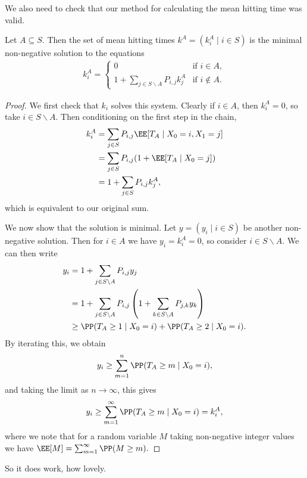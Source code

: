 We also need to check that our method for calculating the mean hitting time was valid.

\begin{theorem}
	Let $A \subseteq S$. Then the set of mean hitting times $k^A = (k_i^A \mid i \in S)$ is the minimal non-negative solution to the equations
	\begin{align*}
		k_i^A = \begin{cases}
			0 &\mbox{if } i  \in A, \\
			1 + \sum_{j \in S\backslash A} P_{i, j} k_j^A &\mbox{if } i \not \in A.
		   \end{cases}
	\end{align*}
\end{theorem}
\begin{proof}
	We first check that $k_i$ solves this system. Clearly if $i \in A$, then $k_i^A = 0$, so take $i \in S \backslash A$. Then conditioning on the first step in the chain,
	\begin{align*}
		k_i^A &= \sum_{j \in S} P_{i, j}\EE[T_A \mid X_0 = i, X_1 = j]  \\
		&= \sum_{j \in S} P_{i, j}(1 + \EE[T_A \mid X_0 = j]) \\
		&= 1 + \sum_{j \in S} P_{i, j} k_j^A, 	
	\end{align*}
	which is equivalent to our original sum.

	We now show that the solution is minimal. Let $y = (y_i \mid i \in S)$ be another non-negative solution. Then for $i \in A$ we have $y_i = k_i^A = 0$, so consider $i \in S \backslash A$. We can then write
	\begin{align*}
	y_i &= 1 + \sum_{j \in S \backslash A} P_{i, j} y_j  \\
	&= 1 + \sum_{j \in S \backslash A} P_{i, j}\left(1 + \sum_{k \in S \backslash A} P_{j, k} y_k\right) \\
	&\geq \PP(T_A \geq 1 \mid X_0 = i) + \PP(T_A \geq 2 \mid X_0 = i).
	\end{align*}
	By iterating this, we obtain
	$$
	y_i \geq \sum_{m = 1}^n \PP(T_A \geq m \mid X_0 = i),
	$$
	and taking the limit as $n \rightarrow \infty$, this gives
	$$
	y_i \geq \sum_{m = 1}^{\infty} \PP(T_A \geq m \mid X_0 = i) = k_i^A,
	$$
	where we note that for a random variable $M$ taking non-negative integer values we have $\EE[M] = \sum_{m = 1}^{\infty} \PP(M \geq m).$
\end{proof}

So it does work, how lovely.

